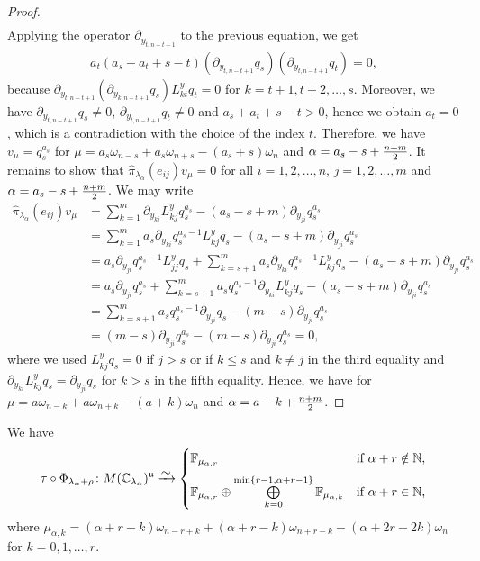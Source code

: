 \begin{proof}
\begin{align*}
\end{align*}
Applying the operator $\partial_{y_{t,n-t+1}}$ to the previous equation, we get
\begin{align*}
  a_t(a_s+a_t+s-t) (\partial_{y_{t,n-t+1}} q_s)(\partial_{y_{t,n-t+1}} q_t) = 0,
\end{align*}
because $\partial_{y_{t,n-t+1}} (\partial_{y_{k,n-t+1}}q_s) L^y_{kt}q_t=0$ for $k=t+1,t+2,\dots,s$. Moreover, we have $\partial_{y_{t,n-t+1}} q_s \neq 0$, $\partial_{y_{t,n-t+1}} q_t \neq 0$ and $a_s +a_t +s-t >0$, hence we obtain $a_t = 0$, which is a contradiction with the choice of the index $t$. Therefore, we have $v_\mu = q_s^{a_s}$ for $\mu= a_s \omega_{n-s} +a_s \omega_{n+s} - (a_s+s)\omega_n$ and $\alpha=a_s -s + {n + m \over 2}$. It remains to show that $\hat{\pi}_{\lambda_\alpha}\!(e_{ij})v_\mu=0$ for all $i=1,2,\dots,n$, $j=1,2,\dots,m$ and $\alpha=a_s-s+{n+m \over 2}$.
We may write
\begin{align*}
  \hat{\pi}_{\lambda_\alpha}\!(e_{ij})v_\mu &= \sum_{k=1}^m  \partial_{y_{ki}} L^y_{kj}q_s^{a_s} - (a_s-s+m) \partial_{y_{ji}}q_s^{a_s} \\
  &= \sum_{k=1}^m  a_s \partial_{y_{ki}} q_s^{a_s-1}L^y_{kj}q_s - (a_s-s+m) \partial_{y_{ji}}q_s^{a_s} \\
  & =a_s \partial_{y_{ji}} q_s^{a_s-1}L^y_{jj}q_s + \sum_{k=s+1}^m  a_s \partial_{y_{ki}} q_s^{a_s-1}L^y_{kj}q_s - (a_s-s+m) \partial_{y_{ji}}q_s^{a_s} \\ &= a_s \partial_{y_{ji}} q_s^{a_s} +  \sum_{k=s+1}^m  a_s  q_s^{a_s-1} \partial_{y_{ki}}L^y_{kj}q_s - (a_s-s+m) \partial_{y_{ji}}q_s^{a_s} \\
  &=  \sum_{k=s+1}^m  a_s  q_s^{a_s-1} \partial_{y_{ji}}q_s -(m-s)\partial_{y_{ji}}q_s^{a_s} \\
  &=(m-s)\partial_{y_{ji}}q_s^{a_s}-(m-s)\partial_{y_{ji}}q_s^{a_s}=0,
\end{align*}
where we used $L^y_{kj}q_s=0$ if $j>s$ or if $k \leq s$ and $k\neq j$ in the third equality and $\partial_{y_{ki}}L^y_{kj}q_s=\partial_{y_{ji}} q_s$ for $k > s$ in the fifth equality. Hence, we have  for $\mu=a \omega_{n-k} + a\omega_{n+k}-(a+k)\omega_n$ and $\alpha = a-k + {n+m \over 2}$.
\end{proof}

\begin{theorem}\label{thm:singular vectors decomposition AGS}
We have
\begin{align*}
  \tau \circ \Phi_{\lambda_\alpha+\rho} \colon M(\C_{\lambda_\alpha})^\mfrak{u} \riso
  \begin{cases}
    \mathbb{F}_{\mu_{\alpha,r}} &  \text{if $\alpha+r \notin \N$}, \\[2mm]
    \mathbb{F}_{\mu_{\alpha,r}} \oplus \bigoplus\limits_{k=0}^{\min\{r-1,\alpha+r-1\}} \mathbb{F}_{\mu_{\alpha,k}} & \text{if $\alpha + r \in \N$,}
  \end{cases}
\end{align*}
where $\mu_{\alpha,k}=(\alpha+r-k)\omega_{n-r+k}+(\alpha+r-k)\omega_{n+r-k}-(\alpha+2r-2k)\omega_n$ for $k=0,1,\dots,r$.
\end{theorem}

